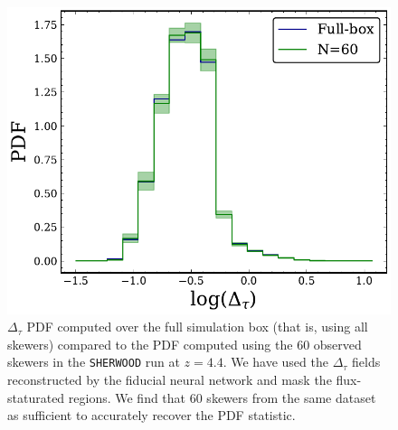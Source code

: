 \begin{figure}
    \centering
    \includegraphics[width=0.85\linewidth]{img/ML/PDF_full_vs_60.pdf}
    \caption{$\Delta_\tau$ PDF computed over the full simulation box (that is, using all skewers) compared to the PDF computed using the 60 observed skewers in the \texttt{SHERWOOD} run at $z=4.4$. We have used the $\Delta_\tau$ fields reconstructed by the fiducial neural network and mask the flux-staturated regions.
We find that 60 skewers from the same dataset as sufficient to accurately recover the PDF statistic.}
    \label{fig: PDF sample vs full}
\end{figure}


















































